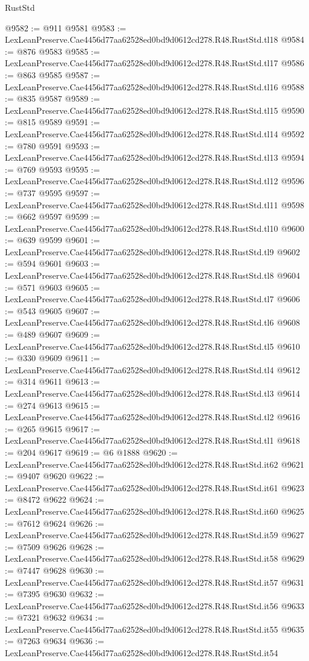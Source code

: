 \begin{lexlean}{RustStd}
\begin{coremodule}
@9582 := @911 @9581
@9583 := LexLeanPreserve.Cae4456d77aa62528ed0bd9d0612cd278.R48.RustStd.tl18
@9584 := @876 @9583
@9585 := LexLeanPreserve.Cae4456d77aa62528ed0bd9d0612cd278.R48.RustStd.tl17
@9586 := @863 @9585
@9587 := LexLeanPreserve.Cae4456d77aa62528ed0bd9d0612cd278.R48.RustStd.tl16
@9588 := @835 @9587
@9589 := LexLeanPreserve.Cae4456d77aa62528ed0bd9d0612cd278.R48.RustStd.tl15
@9590 := @815 @9589
@9591 := LexLeanPreserve.Cae4456d77aa62528ed0bd9d0612cd278.R48.RustStd.tl14
@9592 := @780 @9591
@9593 := LexLeanPreserve.Cae4456d77aa62528ed0bd9d0612cd278.R48.RustStd.tl13
@9594 := @769 @9593
@9595 := LexLeanPreserve.Cae4456d77aa62528ed0bd9d0612cd278.R48.RustStd.tl12
@9596 := @737 @9595
@9597 := LexLeanPreserve.Cae4456d77aa62528ed0bd9d0612cd278.R48.RustStd.tl11
@9598 := @662 @9597
@9599 := LexLeanPreserve.Cae4456d77aa62528ed0bd9d0612cd278.R48.RustStd.tl10
@9600 := @639 @9599
@9601 := LexLeanPreserve.Cae4456d77aa62528ed0bd9d0612cd278.R48.RustStd.tl9
@9602 := @594 @9601
@9603 := LexLeanPreserve.Cae4456d77aa62528ed0bd9d0612cd278.R48.RustStd.tl8
@9604 := @571 @9603
@9605 := LexLeanPreserve.Cae4456d77aa62528ed0bd9d0612cd278.R48.RustStd.tl7
@9606 := @543 @9605
@9607 := LexLeanPreserve.Cae4456d77aa62528ed0bd9d0612cd278.R48.RustStd.tl6
@9608 := @489 @9607
@9609 := LexLeanPreserve.Cae4456d77aa62528ed0bd9d0612cd278.R48.RustStd.tl5
@9610 := @330 @9609
@9611 := LexLeanPreserve.Cae4456d77aa62528ed0bd9d0612cd278.R48.RustStd.tl4
@9612 := @314 @9611
@9613 := LexLeanPreserve.Cae4456d77aa62528ed0bd9d0612cd278.R48.RustStd.tl3
@9614 := @274 @9613
@9615 := LexLeanPreserve.Cae4456d77aa62528ed0bd9d0612cd278.R48.RustStd.tl2
@9616 := @265 @9615
@9617 := LexLeanPreserve.Cae4456d77aa62528ed0bd9d0612cd278.R48.RustStd.tl1
@9618 := @204 @9617
@9619 := @6 @1888
@9620 := LexLeanPreserve.Cae4456d77aa62528ed0bd9d0612cd278.R48.RustStd.it62
@9621 := @9407 @9620
@9622 := LexLeanPreserve.Cae4456d77aa62528ed0bd9d0612cd278.R48.RustStd.it61
@9623 := @8472 @9622
@9624 := LexLeanPreserve.Cae4456d77aa62528ed0bd9d0612cd278.R48.RustStd.it60
@9625 := @7612 @9624
@9626 := LexLeanPreserve.Cae4456d77aa62528ed0bd9d0612cd278.R48.RustStd.it59
@9627 := @7509 @9626
@9628 := LexLeanPreserve.Cae4456d77aa62528ed0bd9d0612cd278.R48.RustStd.it58
@9629 := @7447 @9628
@9630 := LexLeanPreserve.Cae4456d77aa62528ed0bd9d0612cd278.R48.RustStd.it57
@9631 := @7395 @9630
@9632 := LexLeanPreserve.Cae4456d77aa62528ed0bd9d0612cd278.R48.RustStd.it56
@9633 := @7321 @9632
@9634 := LexLeanPreserve.Cae4456d77aa62528ed0bd9d0612cd278.R48.RustStd.it55
@9635 := @7263 @9634
@9636 := LexLeanPreserve.Cae4456d77aa62528ed0bd9d0612cd278.R48.RustStd.it54

\end{coremodule}
\end{lexlean}
